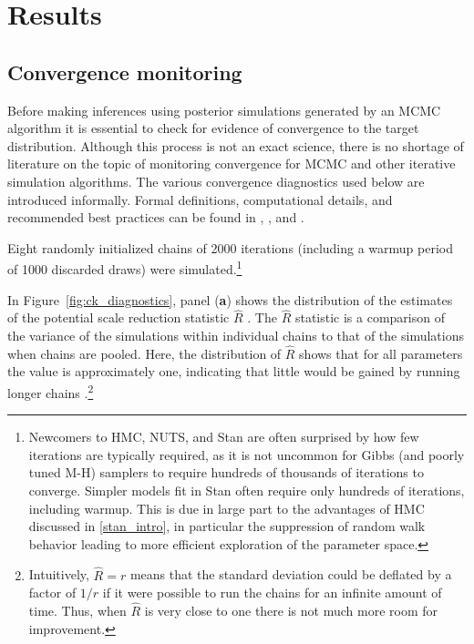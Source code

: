 \section{Results}
\label{results_convergence_checking}


\subsection{Convergence monitoring}
\label{subsection_convergence}

Before making inferences using posterior simulations generated by an MCMC algorithm 
it is essential to check for evidence of convergence to the target distribution. Although this 
process is not an exact science, there is no shortage of literature on the topic of monitoring 
convergence for MCMC and other iterative simulation algorithms. The various convergence 
diagnostics used below are introduced informally. Formal definitions, computational details, 
and recommended best practices can be found in , 
, and .

Eight randomly initialized chains of 2000 iterations (including a warmup period of 1000 
discarded draws) were simulated.\footnote{Newcomers to HMC, NUTS, and Stan are 
often surprised by how few iterations are typically required, as it is not uncommon for 
Gibbs (and poorly tuned M-H) samplers to require hundreds of thousands of iterations 
to converge. Simpler models fit in Stan often require only hundreds of iterations, including 
warmup. This is due in large part to the advantages of HMC discussed in \ref{stan_intro}, in
particular the suppression of random walk behavior leading to more efficient exploration
of the parameter space.} 

In Figure~\ref{fig:ck_diagnostics}, panel ({\bf a}) shows the distribution of the estimates of 
the potential scale reduction statistic $\hat{R}$  . The $\hat{R}$ 
statistic is a comparison of the variance of the simulations within individual chains to that of 
the simulations when chains are pooled. Here, the distribution of $\hat{R}$ shows that for 
all parameters the value is approximately one, indicating that little would be gained by running 
longer chains .\footnote{
Intuitively, $\hat{R}  = r$ means that the standard deviation could be deflated by a factor of $1/r$ 
if it were possible to run the chains for an infinite amount of time. Thus, when $\hat{R}$ is very close
to one there is not much more room for improvement.} 

